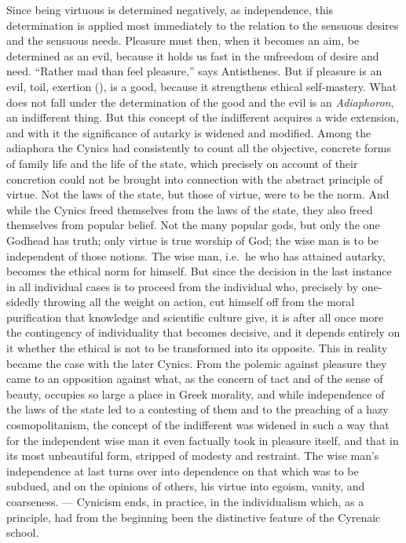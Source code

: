 Since being virtuous is determined negatively, as independence, this determination is applied most immediately to the relation to the sensuous desires and the sensuous needs. Pleasure must then, when it becomes an aim, be determined
as an evil, because it holds us fast in the unfreedom of desire and need. ``Rather mad than feel pleasure,'' says
Antisthenes. But if pleasure is an evil, toil, exertion (), is a good, because it strengthens ethical self-mastery. What does not fall under the determination of the
good and the evil is an \emph{Adiaphoron}, an indifferent thing. But
this concept of the indifferent acquires a wide extension,
and with it the significance of autarky is widened and modified.
Among the adiaphora the Cynics had consistently to count all the
objective, concrete forms of family life and the life of the state, which
precisely on account of their concretion could not be brought into
connection with the abstract principle of virtue. Not the laws of the state,
but those of virtue, were to be the norm. And while the Cynics freed themselves from the laws of the state, they also freed themselves
from popular belief. Not the many popular gods, but only the one
Godhead has truth; only virtue is true worship of God; the
wise man is to be independent of those notions. The wise man,
i.e.\ he who has attained autarky, becomes the ethical norm for
himself. But since the decision in the last instance in all individual
cases is to proceed from the individual who, precisely by one-sidedly
throwing all the weight on action, cut himself off from the moral
purification that knowledge and scientific culture give,
it is after all once more the contingency of individuality that
becomes decisive, and it depends entirely on it whether
the ethical is not to be transformed into its opposite. This in
reality became the case with the later Cynics. From the polemic against pleasure they came to an opposition against what,
as the concern of tact and of the sense of beauty, occupies so large
a place in Greek morality, and while independence of
the laws of the state led to a contesting of them and to the preaching
of a hazy cosmopolitanism, the concept of the indifferent was widened
in such a way that for the independent wise man it even factually took in
pleasure itself, and that in its most unbeautiful form, stripped of modesty and restraint. The wise man's independence
at last turns over into dependence on that which was to be subdued, and
on the opinions of others, his virtue into egoism, vanity, and
coarseness. --- Cynicism ends, in practice, in the individualism which,
as a principle, had from the beginning been the distinctive feature of the Cyrenaic school.


